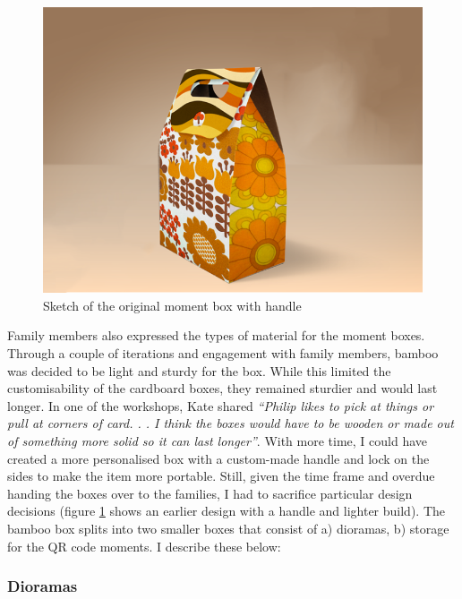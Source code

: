 \begin{figure}[htp]
\centering
\includegraphics[width=.6\linewidth]{Images/ChapterFour/originalDesign.png}
\caption{Sketch of the original moment box with handle}
\label{fig:oldDesign}
\end{figure}
Family members also expressed the types of material for the moment boxes. Through a couple of iterations and engagement with family members, bamboo was decided to be light and sturdy for the box. While this limited the customisability of the cardboard boxes, they remained sturdier and would last longer. In one of the workshops, Kate shared \textit{``Philip likes to pick at things or pull at corners of card. . . I think the boxes would have to be wooden or made out of something more solid so it can last longer''}. With more time, I could have created a more personalised box with a custom-made handle and lock on the sides to make the item more portable. Still, given the time frame and overdue handing the boxes over to the families, I had to sacrifice particular design decisions (figure \ref{fig:oldDesign} shows an earlier design with a handle and lighter build). The bamboo box splits into two smaller boxes that consist of a) dioramas, b) storage for the QR code moments. I describe these below:

\subsubsection{Dioramas}
\label{Dioramas}

